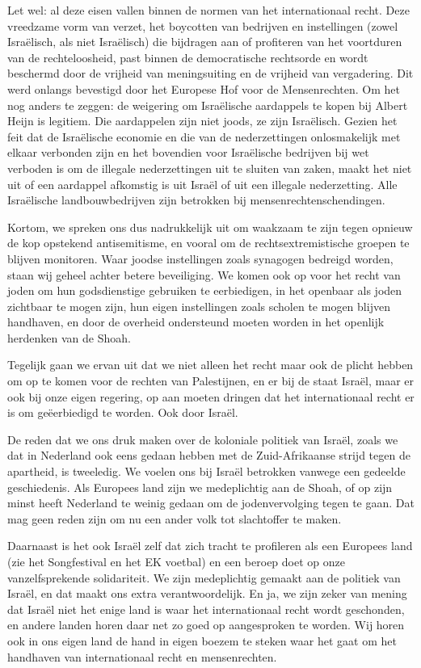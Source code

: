 Let wel: al deze eisen vallen binnen de normen van het internationaal
recht. Deze vreedzame vorm van verzet, het boycotten van bedrijven en
instellingen (zowel Israëlisch, als niet Israëlisch) die bijdragen aan
of profiteren van het voortduren van de rechteloosheid, past binnen de
democratische rechtsorde en wordt beschermd door de vrijheid van
meningsuiting en de vrijheid van vergadering. Dit werd onlangs bevestigd
door het Europese Hof voor de Mensenrechten. Om het nog anders te
zeggen: de weigering om Israëlische aardappels te kopen bij Albert Heijn
is legitiem. Die aardappelen zijn niet joods, ze zijn Israëlisch. Gezien
het feit dat de Israëlische economie en die van de nederzettingen
onlosmakelijk met elkaar verbonden zijn en het bovendien voor
Israëlische bedrijven bij wet verboden is om de illegale nederzettingen
uit te sluiten van zaken, maakt het niet uit of een aardappel afkomstig
is uit Israël of uit een illegale nederzetting. Alle Israëlische
landbouwbedrijven zijn betrokken bij mensenrechtenschendingen.

Kortom, we spreken ons dus nadrukkelijk uit om waakzaam te zijn tegen
opnieuw de kop opstekend antisemitisme, en vooral om de
rechtsextremistische groepen te blijven monitoren. Waar joodse
instellingen zoals synagogen bedreigd worden, staan wij geheel achter
betere beveiliging. We komen ook op voor het recht van joden om hun
godsdienstige gebruiken te eerbiedigen, in het openbaar als joden
zichtbaar te mogen zijn, hun eigen instellingen zoals scholen te mogen
blijven handhaven, en door de overheid ondersteund moeten worden in het
openlijk herdenken van de Shoah.

Tegelijk gaan we ervan uit dat we niet alleen het recht maar ook de
plicht hebben om op te komen voor de rechten van Palestijnen, en er bij
de staat Israël, maar er ook bij onze eigen regering, op aan moeten
dringen dat het internationaal recht er is om geëerbiedigd te worden.
Ook door Israël.

De reden dat we ons druk maken over de koloniale politiek van Israël,
zoals we dat in Nederland ook eens gedaan hebben met de Zuid-Afrikaanse
strijd tegen de apartheid, is tweeledig. We voelen ons bij Israël
betrokken vanwege een gedeelde geschiedenis. Als Europees land zijn we
medeplichtig aan de Shoah, of op zijn minst heeft Nederland te weinig
gedaan om de jodenvervolging tegen te gaan. Dat mag geen reden zijn om
nu een ander volk tot slachtoffer te maken.

Daarnaast is het ook Israël zelf dat zich tracht te profileren als een
Europees land (zie het Songfestival en het EK voetbal) en een beroep
doet op onze vanzelfsprekende solidariteit. We zijn medeplichtig gemaakt
aan de politiek van Israël, en dat maakt ons extra verantwoordelijk. En
ja, we zijn zeker van mening dat Israël niet het enige land is waar het
internationaal recht wordt geschonden, en andere landen horen daar net
zo goed op aangesproken te worden. Wij horen ook in ons eigen land de
hand in eigen boezem te steken waar het gaat om het handhaven van
internationaal recht en mensenrechten.

